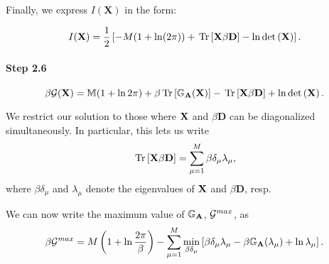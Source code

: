 Finally, we express $I(\mathbf{X})$ in the form:

\begin{equation}
I(\mathbf{X}) = \frac{1}{2} \left[ -M(1 + \ln(2\pi)) + \mbox{}\operatorname{Tr}\left[\mathbf{X}\beta\mathbf{D}\right] - \ln \mbox{}{\text{det}}\left(\mathbf{X}\right) \right].
\end{equation}

\paragraph{Step 2.6}
\begin{equation}
  \beta\mathcal{G}(\mathbf{X})=\mathbb{M}(1+\ln 2\pi)+\beta\mbox{}\operatorname{Tr}\left[\mathbb{G}_{\mathbf{A}}(\mathbf{X})\right] - \mbox{}\operatorname{Tr}\left[\mathbf{X}\beta\mathbf{D}\right] +  \ln \mbox{}{\text{det}}\left(\mathbf{X}\right).
\end{equation}

We restrict our solution to those where $\mathbf{X}$ and $\beta\mathbf{D}$ can be diagonalized simultaneously.
In particular, this lets us write
\begin{equation}
\mbox{}\operatorname{Tr}\left[\mathbf{X}\beta\mathbf{D}\right] = \sum_{\mu=1}^{M}\beta\delta_{\mu}\lambda_{\mu}   ,
\end{equation}
where $\beta\delta_{\mu}$ and $\lambda_{\mu}$ denote the eigenvalues of $\mathbf{X}$ and $\beta\mathbf{D}$, resp.

We can now write the maximum value of $\mathbb{G}_{\mathbf{A}}$, $\mathcal{G}^{max}$, as
\begin{equation}
\label{eqn:gmax_final}
\beta\mathcal{G}^{max} = M \left( 1 + \ln \frac{2\pi}{\beta} \right) - \sum_{\mu=1}^{M} \min_{\beta\delta_{\mu}} \left[\beta\delta_{\mu}\lambda_{\mu}
- \beta\mathbb{G}_{\mathbf{A}}(\lambda_{\mu}) + \ln \lambda_{\mu} \right]   .
\end{equation}
